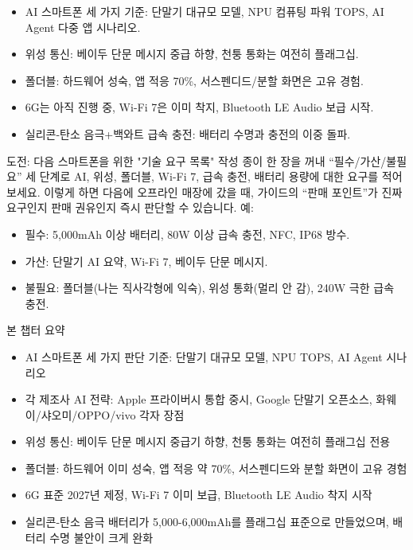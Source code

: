 
\begin{itemize}
  \item AI 스마트폰 세 가지 기준: 단말기 대규모 모델, NPU 컴퓨팅 파워 TOPS, AI Agent 다중 앱 시나리오.
  \item 위성 통신: 베이두 단문 메시지 중급 하향, 천퉁 통화는 여전히 플래그십.
  \item 폴더블: 하드웨어 성숙, 앱 적응 70\%, 서스펜디드/분할 화면은 고유 경험.
  \item 6G는 아직 진행 중, Wi-Fi 7은 이미 착지, Bluetooth LE Audio 보급 시작.
  \item 실리콘-탄소 음극+백와트 급속 충전: 배터리 수명과 충전의 이중 돌파.
\end{itemize}

\begin{tcbpractice}{도전: 다음 스마트폰을 위한 "기술 요구 목록" 작성}
종이 한 장을 꺼내 “필수/가산/불필요” 세 단계로 AI, 위성, 폴더블, Wi-Fi 7, 급속 충전, 배터리 용량에 대한 요구를 적어보세요. 이렇게 하면 다음에 오프라인 매장에 갔을 때, 가이드의 “판매 포인트”가 진짜 요구인지 판매 권유인지 즉시 판단할 수 있습니다. 예:

\begin{itemize}
  \item 필수: 5,000mAh 이상 배터리, 80W 이상 급속 충전, NFC, IP68 방수.
  \item 가산: 단말기 AI 요약, Wi-Fi 7, 베이두 단문 메시지.
  \item 불필요: 폴더블(나는 직사각형에 익숙), 위성 통화(멀리 안 감), 240W 극한 급속 충전.
\end{itemize}

\end{tcbpractice}

\begin{tcbsummary}{본 챕터 요약}
\begin{itemize}
  \item AI 스마트폰 세 가지 판단 기준: 단말기 대규모 모델, NPU TOPS, AI Agent 시나리오
  \item 각 제조사 AI 전략: Apple 프라이버시 통합 중시, Google 단말기 오픈소스, 화웨이/샤오미/OPPO/vivo 각자 장점
  \item 위성 통신: 베이두 단문 메시지 중급기 하향, 천퉁 통화는 여전히 플래그십 전용
  \item 폴더블: 하드웨어 이미 성숙, 앱 적응 약 70\%, 서스펜디드와 분할 화면이 고유 경험
  \item 6G 표준 2027년 제정, Wi-Fi 7 이미 보급, Bluetooth LE Audio 착지 시작
  \item 실리콘-탄소 음극 배터리가 5,000-6,000mAh를 플래그십 표준으로 만들었으며, 배터리 수명 불안이 크게 완화
\end{itemize}

\end{tcbsummary}
